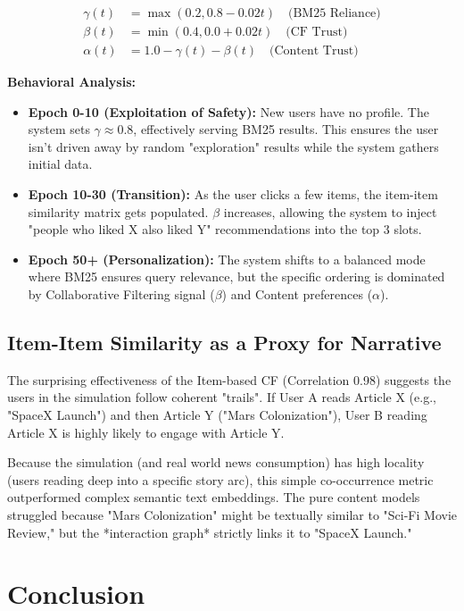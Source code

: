\documentclass[11pt,a4paper]{article}
\begin{document}
\begin{equation}
\begin{aligned}
\gamma(t) &= \max(0.2, 0.8 - 0.02t) \quad \text{(BM25 Reliance)} \\
\beta(t) &= \min(0.4, 0.0 + 0.02t) \quad \text{(CF Trust)} \\
\alpha(t) &= 1.0 - \gamma(t) - \beta(t) \quad \text{(Content Trust)}
\end{aligned}
\end{equation}

\textbf{Behavioral Analysis:}
\begin{itemize}
    \item \textbf{Epoch 0-10 (Exploitation of Safety):} New users have no profile. The system sets $\gamma \approx 0.8$, effectively serving BM25 results. This ensures the user isn't driven away by random "exploration" results while the system gathers initial data.
    \item \textbf{Epoch 10-30 (Transition):} As the user clicks a few items, the item-item similarity matrix gets populated. $\beta$ increases, allowing the system to inject "people who liked X also liked Y" recommendations into the top 3 slots.
    \item \textbf{Epoch 50+ (Personalization):} The system shifts to a balanced mode where BM25 ensures query relevance, but the specific ordering is dominated by Collaborative Filtering signal ($\beta$) and Content preferences ($\alpha$).
\end{itemize}

\subsection{Item-Item Similarity as a Proxy for Narrative}
The surprising effectiveness of the Item-based CF (Correlation 0.98) suggests the users in the simulation follow coherent "trails". If User A reads Article X (e.g., "SpaceX Launch") and then Article Y ("Mars Colonization"), User B reading Article X is highly likely to engage with Article Y.

Because the simulation (and real world news consumption) has high locality (users reading deep into a specific story arc), this simple co-occurrence metric outperformed complex semantic text embeddings. The pure content models struggled because "Mars Colonization" might be textually similar to "Sci-Fi Movie Review," but the *interaction graph* strictly links it to "SpaceX Launch."

\section{Conclusion}
\end{document}
